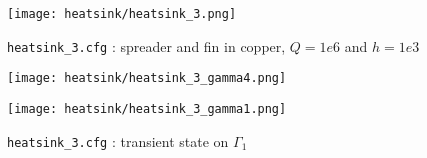\begin{figure}[!h]
\centering
\texttt{[image: heatsink/heatsink\_3.png]}
\caption{\lstinline!heatsink_3.cfg! : spreader and fin in copper, $Q=1e6$ and $h=1e3$}
\end{figure}

\begin{figure}[!h]
\begin{minipage}[b]{.5\linewidth}
\centering
\texttt{[image: heatsink/heatsink\_3\_gamma4.png]}
\caption{\lstinline!heatsink_3.cfg! : transient state on $\Gamma_4$}
\end{minipage}
\begin{minipage}[b]{.5\linewidth}
\centering
\texttt{[image: heatsink/heatsink\_3\_gamma1.png]}
\caption{\lstinline!heatsink_3.cfg! : transient state on $\Gamma_1$}
\end{minipage}
\end{figure}



\clearpage
